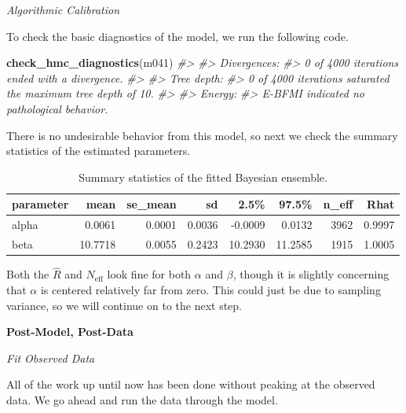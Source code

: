 \documentclass[11pt, oneside, openany]{scrbook}
\newenvironment{Shaded}{\begin{snugshade}}{\end{snugshade}}
\newcommand{\CommentTok}[1]{\textcolor[rgb]{0.56,0.35,0.01}{\textit{#1}}}
\newcommand{\FunctionTok}[1]{\textcolor[rgb]{0.13,0.29,0.53}{\textbf{#1}}}
\newcommand{\NormalTok}[1]{#1}
\begin{document}

\emph{Algorithmic Calibration}

To check the basic diagnostics of the model, we run the following code.


\begin{Shaded}
\begin{Highlighting}[]
\FunctionTok{check\_hmc\_diagnostics}\NormalTok{(m041)}
\CommentTok{\#\textgreater{} }
\CommentTok{\#\textgreater{} Divergences:}
\CommentTok{\#\textgreater{} 0 of 4000 iterations ended with a divergence.}
\CommentTok{\#\textgreater{} }
\CommentTok{\#\textgreater{} Tree depth:}
\CommentTok{\#\textgreater{} 0 of 4000 iterations saturated the maximum tree depth of 10.}
\CommentTok{\#\textgreater{} }
\CommentTok{\#\textgreater{} Energy:}
\CommentTok{\#\textgreater{} E{-}BFMI indicated no pathological behavior.}
\end{Highlighting}
\end{Shaded}


There is no undesirable behavior from this model, so next we check the summary statistics of the estimated parameters.

\begin{table}[!h]
\centering
\caption{\label{tab:ch041-Cloudy-Toupee}Summary statistics of the fitted Bayesian ensemble.}
\centering
\begin{tabular}[t]{lrrrrrrr}
\toprule
parameter & mean & se\_mean & sd & 2.5\% & 97.5\% & n\_eff & Rhat\\
\midrule
alpha & 0.0061 & 0.0001 & 0.0036 & -0.0009 & 0.0132 & 3962 & 0.9997\\
beta & 10.7718 & 0.0055 & 0.2423 & 10.2930 & 11.2585 & 1915 & 1.0005\\
\bottomrule
\end{tabular}
\end{table}

Both the \(\hat{R}\) and \(N_{\mathrm{eff}}\) look fine for both \(\alpha\) and \(\beta\), though it is slightly concerning that \(\alpha\) is centered relatively far from zero. This could just be due to sampling variance, so we will continue on to the next step.

\textbf{Post-Model, Post-Data}

\emph{Fit Observed Data}

All of the work up until now has been done without peaking at the observed data. We go ahead and run the data through the model.
\end{document}
